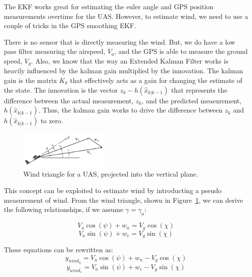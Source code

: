 The EKF works great for estimating the euler angle and GPS position measurements overtime for the UAS.
However, to estimate wind, we need to use a couple of tricks in the GPS smoothing EKF.

There is no sensor that is directly measuring the wind. But, we do have a low pass filter measuring the airspeed, $V_a$, and the GPS is able to measure the ground speed, $V_g$.
Also, we know that the way an Extended Kalman Filter works is heavily influenced by the kalman gain multiplied by the innovation. The kalman gain is the matrix $K_k$ that effectively acts as a gain for changing the estimate of the state.
The innovation is the vector $z_k - h(\hat{x}_{k|k-1})$ that represents the difference between the actual measurement, $z_k$, and the predicted measurement, $h(\hat{x}_{k|k-1})$.
Thus, the kalman gain works to drive the difference between $z_k$ and $h(\hat{x}_{k|k-1})$ to zero.

\begin{figure}[h]  
    \centering
    \includegraphics[width=0.4\textwidth]{images/wind_triangle.png}
    \caption{Wind triangle for a UAS, projected into the vertical plane.}
    \label{fig:wind_triangle}
\end{figure}

This concept can be exploited to estimate wind by introducting a pseudo measurement of wind.
From the wind triangle, shown in Figure~\ref{fig:wind_triangle}, we can derive the following relationships, if we assume $\gamma = \gamma_a$:

\begin{equation}
    V_a \cos(\psi) + w_n = V_g \cos(\chi)
\end{equation}
\begin{equation}
    V_a \sin(\psi) + w_e = V_g \sin(\chi)
\end{equation}

These equations can be rewritten as:
\begin{equation}
    y_{wind_n} = V_a \cos(\psi) + w_n - V_g \cos(\chi)
\end{equation}
\begin{equation}
    y_{wind_e} = V_a \sin(\psi) + w_e - V_g \sin(\chi)
\end{equation}

